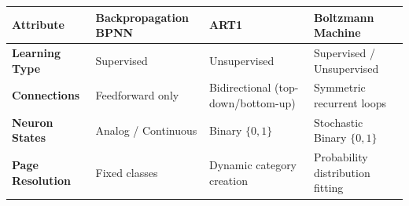 \documentclass[12pt,a4paper]{article}
\renewcommand{\arraystretch}{1.45}
\begin{document}
\begin{tcolorbox}[tikzbox, title={Comparison of Adaptive Architectures}]
\centering
{\renewcommand{\arraystretch}{1.55}%
\begin{tabularx}{\linewidth}{|>{\bfseries}B{3.2cm}|Y|Y|Y|}
\hline
Attribute & Backpropagation BPNN & ART1 & Boltzmann Machine \\
\hline
Learning Type & Supervised & Unsupervised & Supervised / Unsupervised \\
\hline
Connections & Feedforward only & Bidirectional (top-down/bottom-up) & Symmetric recurrent loops \\
\hline
Neuron States & Analog / Continuous & Binary $\{0, 1\}$ & Stochastic Binary $\{0, 1\}$ \\
\hline
Page Resolution & Fixed classes & Dynamic category creation & Probability distribution fitting \\
\hline
\end{tabularx}}
\end{tcolorbox}
\end{document}
